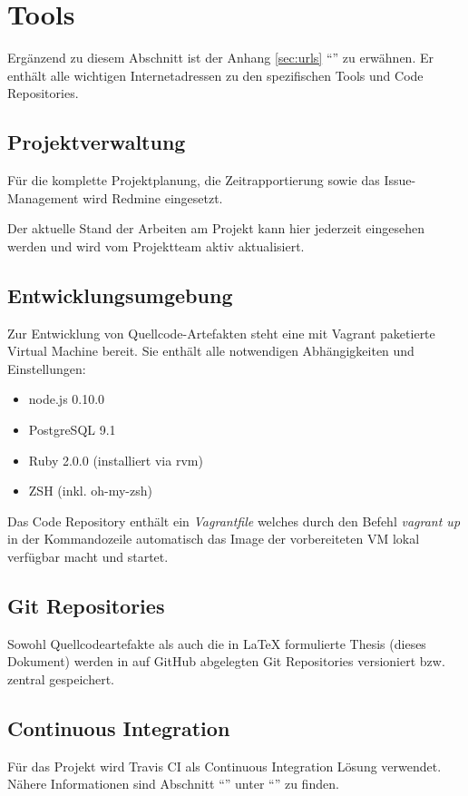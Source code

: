 \section{Tools}
\label{sec:tools}

Ergänzend zu diesem Abschnitt ist der Anhang \ref{sec:urls} ``'' zu erwähnen. Er enthält alle wichtigen Internetadressen zu den spezifischen Tools und Code Repositories.

\subsection{Projektverwaltung}
Für die komplette Projektplanung, die Zeitrapportierung sowie das Issue-Management wird Redmine eingesetzt.

Der aktuelle Stand der Arbeiten am Projekt kann hier jederzeit eingesehen werden und wird vom Projektteam aktiv aktualisiert.


\subsection{Entwicklungsumgebung}
Zur Entwicklung von Quellcode-Artefakten steht eine mit Vagrant \cite{Vagrant} paketierte Virtual Machine bereit. Sie enthält alle notwendigen Abhängigkeiten und Einstellungen:


\begin{itemize}
	\item node.js 0.10.0
	\item PostgreSQL 9.1
	\item Ruby 2.0.0 (installiert via rvm)
	\item ZSH (inkl. oh-my-zsh)
\end{itemize}

Das Code Repository enthält ein \emph{Vagrantfile} welches durch den Befehl \emph{vagrant up} in der Kommandozeile automatisch das Image der vorbereiteten VM lokal verfügbar macht und startet.

\subsection{Git Repositories}
Sowohl Quellcodeartefakte als auch die in LaTeX formulierte Thesis (dieses Dokument) werden in auf GitHub abgelegten Git Repositories versioniert bzw. zentral gespeichert.

\subsection{Continuous Integration}
Für das Projekt wird Travis CI als Continuous Integration Lösung verwendet. Nähere Informationen sind Abschnitt ``'' unter ``'' zu finden.